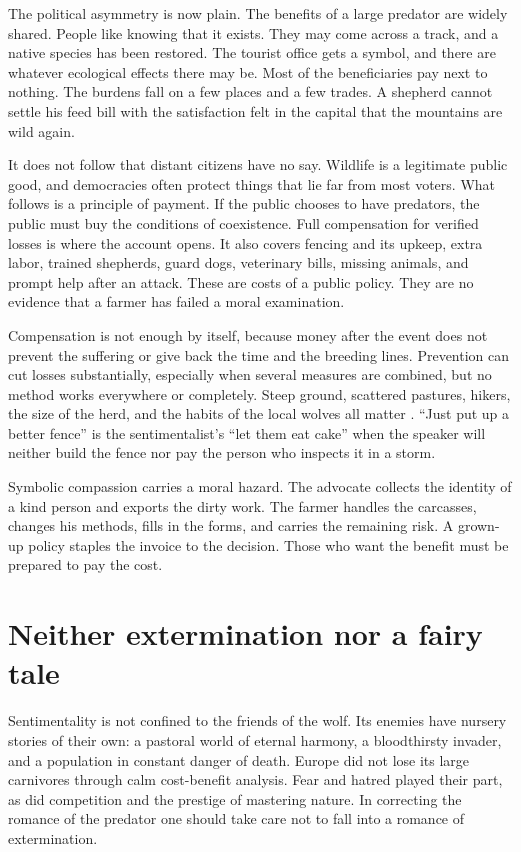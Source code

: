 \documentclass[12pt,a4paper]{book}
\begin{document}
The political asymmetry is now plain. The benefits of a large predator are widely shared. People like knowing that it exists. They may come across a track, and a native species has been restored. The tourist office gets a symbol, and there are whatever ecological effects there may be. Most of the beneficiaries pay next to nothing. The burdens fall on a few places and a few trades. A shepherd cannot settle his feed bill with the satisfaction felt in the capital that the mountains are wild again.

It does not follow that distant citizens have no say. Wildlife is a legitimate public good, and democracies often protect things that lie far from most voters. What follows is a principle of payment. If the public chooses to have predators, the public must buy the conditions of coexistence. Full compensation for verified losses is where the account opens. It also covers fencing and its upkeep, extra labor, trained shepherds, guard dogs, veterinary bills, missing animals, and prompt help after an attack. These are costs of a public policy. They are no evidence that a farmer has failed a moral examination.

Compensation is not enough by itself, because money after the event does not prevent the suffering or give back the time and the breeding lines. Prevention can cut losses substantially, especially when several measures are combined, but no method works everywhere or completely. Steep ground, scattered pastures, hikers, the size of the herd, and the habits of the local wolves all matter \cite{ECLargeCarnivoreFacts2026,AlpineConventionCarnivorePrevention2024}. ``Just put up a better fence'' is the sentimentalist's ``let them eat cake'' when the speaker will neither build the fence nor pay the person who inspects it in a storm.

Symbolic compassion carries a moral hazard. The advocate collects the identity of a kind person and exports the dirty work. The farmer handles the carcasses, changes his methods, fills in the forms, and carries the remaining risk. A grown-up policy staples the invoice to the decision. Those who want the benefit must be prepared to pay the cost.

\section{Neither extermination nor a fairy tale}

Sentimentality is not confined to the friends of the wolf. Its enemies have nursery stories of their own: a pastoral world of eternal harmony, a bloodthirsty invader, and a population in constant danger of death. Europe did not lose its large carnivores through calm cost-benefit analysis. Fear and hatred played their part, as did competition and the prestige of mastering nature. In correcting the romance of the predator one should take care not to fall into a romance of extermination.
\end{document}
